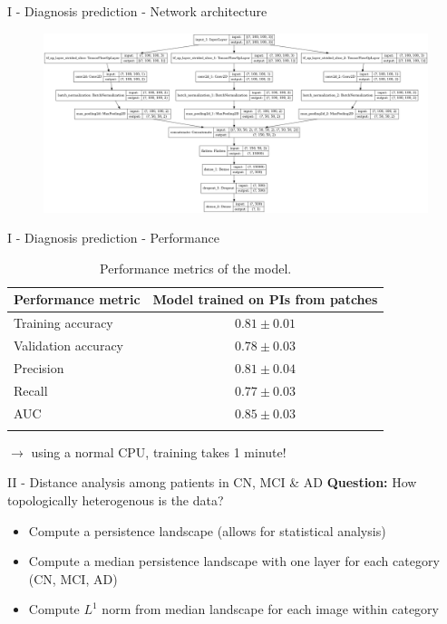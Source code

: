 \documentclass[aspectratio=169, 10pt, dvipsnames]{beamer}
\begin{document}
\begin{frame}[fragile]{I - Diagnosis prediction - Network architecture}
  \begin{figure}
    \centering
    \includegraphics[width=\textwidth]{figures/model.png}
  \end{figure}
\end{frame}


\begin{frame}[fragile]{I - Diagnosis prediction - Performance}
\begin{table}
  \centering
  \begin{tabular}{lc}
    \toprule
    \textbf{Performance metric} & \textbf{Model trained on PIs from patches}\\
    \midrule
    Training accuracy & $0.81\pm 0.01$  \\
    Validation accuracy & $0.78\pm 0.03$  \\
    Precision & $0.81\pm 0.04$  \\
    Recall & $0.77\pm 0.03$  \\
    AUC & $0.85\pm 0.03$  \\
    \bottomrule
    \vspace{1pt}
  \end{tabular}
  \caption{Performance metrics of the model.}
  \label{tab:performance}
\end{table}
$\rightarrow$ using a normal CPU, training  takes 1 minute!
\end{frame}

\begin{frame}[fragile]{II - Distance analysis among patients in CN, MCI \& AD}
\textbf{Question:} How topologically heterogenous is the data?
  \begin{itemize}
  \item Compute a persistence landscape (allows for statistical analysis)
  \item Compute a median persistence landscape with one layer for each category (CN, MCI, AD)
  \item Compute $L^1$ norm from median landscape for each image within category
  \end{itemize}
\end{frame}
\end{document}
